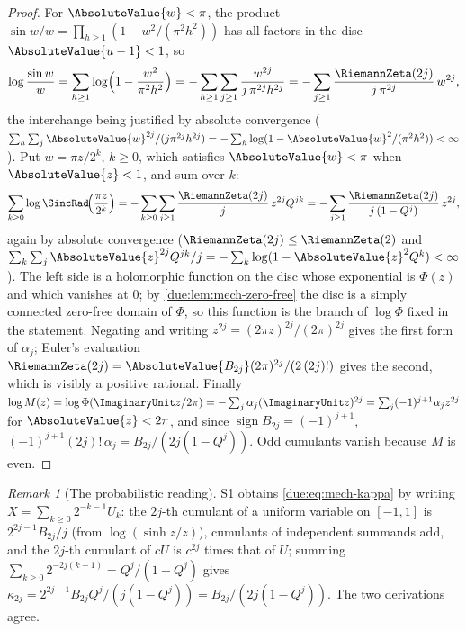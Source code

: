 \documentclass[11pt,oneside]{article}
\theoremstyle{plain}
\theoremstyle{definition}
\theoremstyle{remark}
\newtheorem{remark}[theorem]{Remark}
\newcommand{\PhiUp}{\Phi}                                   %
\newcommand{\Qq}{Q}                                         %
\begin{document}
\begin{proof}
For \(\AbsoluteValue{w}<\pi\), the product \(\sin w/w=\prod_{h\ge1}(1-w^{2}/(\pi^{2}h^{2}))\)
has all factors in the disc \(\AbsoluteValue{u-1}<1\), so
\[
 \log\frac{\sin w}{w}=\sum_{h\ge1}\log\Bigl(1-\frac{w^{2}}{\pi^{2}h^{2}}\Bigr)
 =-\sum_{h\ge1}\sum_{j\ge1}\frac{w^{2j}}{j\,\pi^{2j}h^{2j}}
 =-\sum_{j\ge1}\frac{\RiemannZeta(2j)}{j\,\pi^{2j}}\,w^{2j},
\]
the interchange being justified by absolute convergence
(\(\sum_h\sum_j\AbsoluteValue{w}^{2j}/(j\pi^{2j}h^{2j})
=-\sum_h\log(1-\AbsoluteValue{w}^{2}/(\pi^{2}h^{2}))<\infty\)).
Put \(w=\pi z/2^{k}\), \(k\ge0\), which satisfies \(\AbsoluteValue{w}<\pi\)
when \(\AbsoluteValue{z}<1\), and sum over \(k\):
\[
 \sum_{k\ge0}\log\SincRad\!\Bigl(\frac{\pi z}{2^{k}}\Bigr)
 =-\sum_{k\ge0}\sum_{j\ge1}\frac{\RiemannZeta(2j)}{j}\,z^{2j}\Qq^{jk}
 =-\sum_{j\ge1}\frac{\RiemannZeta(2j)}{j\,(1-\Qq^{j})}\,z^{2j},
\]
again by absolute convergence
(\(\RiemannZeta(2j)\le\RiemannZeta(2)\) and
\(\sum_k\sum_j\AbsoluteValue{z}^{2j}\Qq^{jk}/j=-\sum_k\log(1-\AbsoluteValue{z}^{2}\Qq^{k})<\infty\)).
The left side is a holomorphic function on the disc whose exponential is
\(\PhiUp(z)\) and which vanishes at \(0\); by \cref{due:lem:mech-zero-free}
the disc is a simply connected zero-free domain of \(\PhiUp\), so this
function is the branch of \(\log\PhiUp\) fixed in the statement.  Negating and
writing \(z^{2j}=(2\pi z)^{2j}/(2\pi)^{2j}\) gives the first form of
\(\alpha_j\); Euler's evaluation
\(\RiemannZeta(2j)=\AbsoluteValue{B_{2j}}(2\pi)^{2j}/(2\,(2j)!)\) gives the
second, which is visibly a positive rational.  Finally
\(\log M(z)=\log\PhiUp(\ImaginaryUnit z/2\pi)
=-\sum_j\alpha_j(\ImaginaryUnit z)^{2j}=\sum_j(-1)^{j+1}\alpha_jz^{2j}\)
for \(\AbsoluteValue{z}<2\pi\), and since \(\operatorname{sign}B_{2j}=(-1)^{j+1}\),
\((-1)^{j+1}(2j)!\,\alpha_j=B_{2j}/(2j(1-\Qq^{j}))\).  Odd cumulants vanish
because \(M\) is even.
\end{proof}

\begin{remark}[The probabilistic reading]
\label{due:rmk:mech-cumulants-probabilistic}
S1 obtains \cref{due:eq:mech-kappa} by writing \(X=\sum_{k\ge0}2^{-k-1}U_k\):
the \(2j\)-th cumulant of a uniform variable on \([-1,1]\) is
\(2^{2j-1}B_{2j}/j\) (from \(\log(\sinh z/z)\)), cumulants of independent
summands add, and the \(2j\)-th cumulant of \(cU\) is \(c^{2j}\) times that of
\(U\); summing \(\sum_{k\ge0}2^{-2j(k+1)}=\Qq^{j}/(1-\Qq^{j})\) gives
\(\kappa_{2j}=2^{2j-1}B_{2j}\Qq^{j}/(j(1-\Qq^{j}))=B_{2j}/(2j(1-\Qq^{j}))\).
The two derivations agree.
\end{remark}
\end{document}

